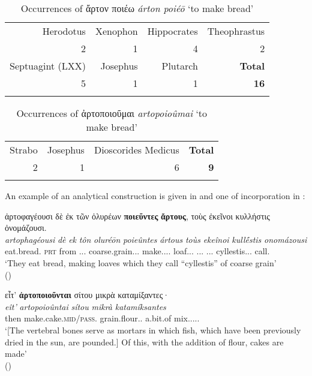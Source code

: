 \documentclass[output=paper,colorlinks,citecolor=brown]{langscibook}
\begin{document}
\begin{table}
	\caption{Occurrences of ἄρτον ποιέω \textit{árton poiéō} `to make bread'}
	\label{tab:C:occurrences-arton-poieo}
	\begin{tabular}{rrrr}
    \lsptoprule
		Herodotus & Xenophon & Hippocrates & Theophrastus \\
		2    & 1  & 4   & 2      \\
        Septuagint (LXX) & Josephus & Plutarch & \textbf{Total} \\
        5   & 1  & 1    & \textbf{16} \\
    \lspbottomrule
	\end{tabular}
\end{table}

\begin{table}
	\caption{Occurrences of ἀρτοποιοῦμαι \textit{artopoioûmai} `to make bread'}
	\label{tab:D:occurrences-artopoioumai}
	\begin{tabular}{rrrr}
    \lsptoprule
		Strabo & Josephus & Dioscorides Medicus & \textbf{Total} \\
		2    & 1  & 6    & \textbf{9}   \\
    \lspbottomrule
	\end{tabular}
\end{table}

An example of an analytical construction is given in  and one of incorporation in :

\ea \label{ex:13}
\glll ἀρτοφαγέουσι		δὲ	ἐκ	τῶν		ὀλυρέων	         \textbf{ποιεῦντες} \textbf{ἄρτους},	τοὺς		ἐκεῖνοι 		κυλλήστις		ὀνομάζουσι.\\
\textit{artophagéousi}		\textit{dè}	\textit{ek}	\textit{tôn} 		\textit{oluréōn}	         \textit{poieûntes} \textit{ártous}		\textit{toùs}		\textit{ekeînoi}			\textit{kullḗstis}		\textit{onomázousi}\\
eat.bread.\Tpl{}		\textsc{prt}	from	\Art{}.\Gen{}.\F{}.\Pl{}	coarse.grain.\Gen{}.\F{}.\Pl{}    make.\Ptcp{}.\Nom{}.\M{}.\Pl{} loaf.\Acc{}.\M{}.\Pl{} 	\Rel{}.\Acc{}.\M{}.\Pl{}	\Dem{}.\Nom{}.\M{}.\Pl{}	cyllestis.\Acc{}.\F{}.\Pl{}	call.\Tpl{}\\
\glt `They eat bread, making loaves which they call ``cyllestis'' of coarse grain' \\
\hspace*{\fill}()
\z

\ea \label{ex:14}
\glll εἶτ’	\textbf{ἀρτοποιοῦνται}	σίτου			μικρὰ		καταμίξαντες·\\
\textit{eît’}	\textit{artopoioûntai}		\textit{sítou}			\textit{mikrà}		\textit{katamíksantes}\\
then	make.cake.\textsc{mid/pass}.\Tpl{}	grain.flour.\Gen{}.\M{}	a.bit.of 	mix.\Aor{}.\Ptcp{}.\Nom{}.\M{}.\Pl{} \\
\glt `[The vertebral bones serve as mortars in which fish, which have been previously dried in the sun, are pounded.] Of this, with the addition of flour, cakes are made' \\
\hspace*{\fill}()
\z
\end{document}
